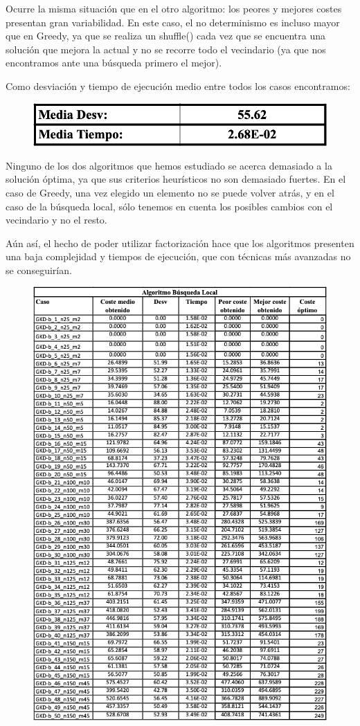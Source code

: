 Ocurre la misma situación que en el otro algoritmo: los peores y mejores costes presentan gran variabilidad. En este caso, el no determinismo es incluso mayor que en Greedy, ya que se realiza un shuffle() cada vez que se encuentra una solución que mejora la actual y no se recorre todo el vecindario (ya que nos encontramos ante una búsqueda primero el mejor). 

Como desviación y tiempo de ejecución medio entre todos los casos encontramos:
\begin{figure}[H] %
    \centering
        \includegraphics[scale=0.35]{img/bl2.png}
\end{figure}

Ninguno de los dos algoritmos que hemos estudiado se acerca demasiado a la solución óptima, ya que sus criterios heurísticos no son demasiado fuertes. En el caso de Greedy, una vez elegido un elemento no se puede volver atrás, y en el caso de la búsqueda local, sólo tenemos en cuenta los posibles cambios con el vecindario y no el resto.

Aún así, el hecho de poder utilizar factorización hace que los algoritmos presenten una baja complejidad y tiempos de ejecución, que con técnicas más avanzadas no se conseguirían.

\begin{figure}[H] %
    \centering
        \includegraphics[scale=0.65]{img/bl.png}
\end{figure}




